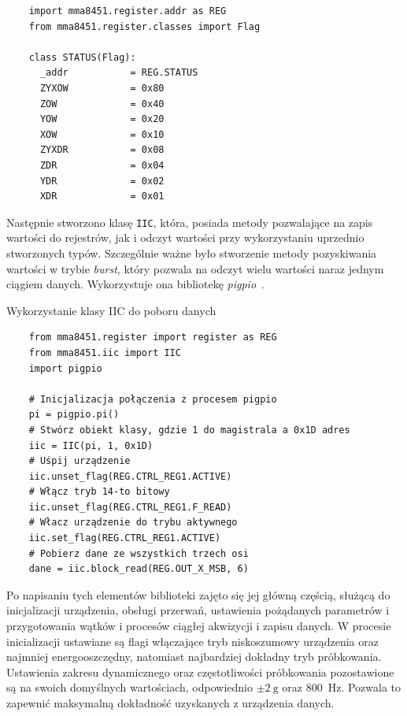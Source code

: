 \documentclass[a4paper,12pt]{mwart}
\begin{document}
\begin{program}
  \caption{Definicja rejestru \lstinline|STATUS| i jego flag}
  \begin{lstlisting}
    import mma8451.register.addr as REG
    from mma8451.register.classes import Flag

    class STATUS(Flag):
      _addr           = REG.STATUS
      ZYXOW           = 0x80
      ZOW             = 0x40
      YOW             = 0x20
      XOW             = 0x10
      ZYXDR           = 0x08
      ZDR             = 0x04
      YDR             = 0x02
      XDR             = 0x01
  \end{lstlisting}
  \label{code:reg}
\end{program}

Następnie stworzono klasę \lstinline|IIC|, która, posiada metody pozwalające na
zapis wartości do rejestrów, jak i odczyt wartości przy wykorzystaniu uprzednio
stworzonych typów. Szczególnie ważne było stworzenie metody pozyskiwania
wartości w trybie \emph{burst}, który pozwala na odczyt wielu wartości naraz
jednym ciągiem danych. Wykorzystuje ona bibliotekę \emph{pigpio}~\cite{pigpio}.

\begin{program}
  \caption{Wykorzystanie klasy IIC do poboru danych}
  \begin{lstlisting}
    from mma8451.register import register as REG
    from mma8451.iic import IIC
    import pigpio

    # Inicjalizacja połączenia z procesem pigpio
    pi = pigpio.pi()
    # Stwórz obiekt klasy, gdzie 1 do magistrala a 0x1D adres
    iic = IIC(pi, 1, 0x1D)
    # Uśpij urządzenie
    iic.unset_flag(REG.CTRL_REG1.ACTIVE)
    # Włącz tryb 14-to bitowy
    iic.unset_flag(REG.CTRL_REG1.F_READ)
    # Włacz urządzenie do trybu aktywnego
    iic.set_flag(REG.CTRL_REG1.ACTIVE)
    # Pobierz dane ze wszystkich trzech osi
    dane = iic.block_read(REG.OUT_X_MSB, 6)
  \end{lstlisting}
  \label{code:iic}
\end{program}

Po napisaniu tych elementów biblioteki zajęto się jej główną częścią, służącą
do inicjalizacji urządzenia, obsługi przerwań, ustawienia pożądanych parametrów
i przygotowania wątków i procesów ciągłej akwizycji i zapisu danych. W procesie
inicializacji ustawiane są flagi włączające tryb niskoszumowy urządzenia oraz
najmniej energooszczędny, natomiast najbardziej dokładny tryb próbkowania.
Ustawienia zakresu dynamicznego oraz częstotliwości próbkowania pozostawione są
na swoich domyślnych wartościach, odpowiednio $\pm\SI{2}{\g}$ oraz
\SI{800}{\hertz}. Pozwala to zapewnić maksymalną dokładność uzyskanych z
urządzenia danych.
\end{document}
